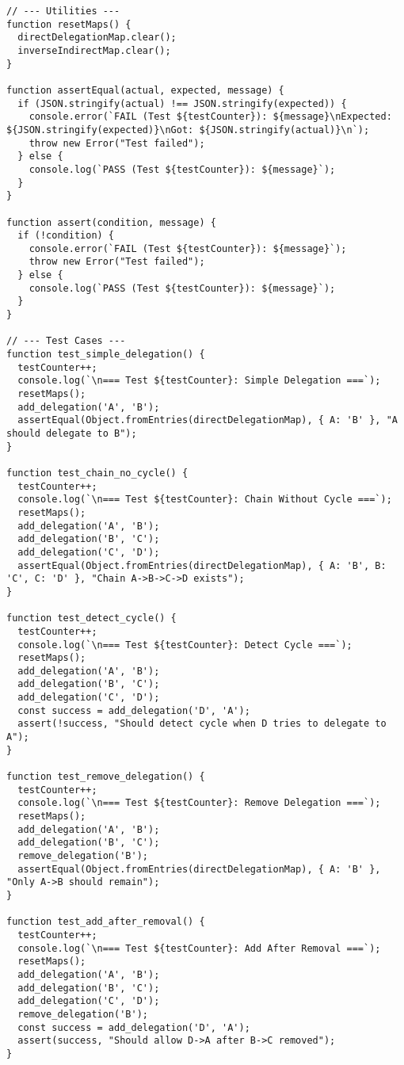 \begin{verbatim}
// --- Utilities ---
function resetMaps() {
  directDelegationMap.clear();
  inverseIndirectMap.clear();
}

function assertEqual(actual, expected, message) {
  if (JSON.stringify(actual) !== JSON.stringify(expected)) {
    console.error(`FAIL (Test ${testCounter}): ${message}\nExpected: ${JSON.stringify(expected)}\nGot: ${JSON.stringify(actual)}\n`);
    throw new Error("Test failed");
  } else {
    console.log(`PASS (Test ${testCounter}): ${message}`);
  }
}

function assert(condition, message) {
  if (!condition) {
    console.error(`FAIL (Test ${testCounter}): ${message}`);
    throw new Error("Test failed");
  } else {
    console.log(`PASS (Test ${testCounter}): ${message}`);
  }
}

// --- Test Cases ---
function test_simple_delegation() {
  testCounter++;
  console.log(`\n=== Test ${testCounter}: Simple Delegation ===`);
  resetMaps();
  add_delegation('A', 'B');
  assertEqual(Object.fromEntries(directDelegationMap), { A: 'B' }, "A should delegate to B");
}

function test_chain_no_cycle() {
  testCounter++;
  console.log(`\n=== Test ${testCounter}: Chain Without Cycle ===`);
  resetMaps();
  add_delegation('A', 'B');
  add_delegation('B', 'C');
  add_delegation('C', 'D');
  assertEqual(Object.fromEntries(directDelegationMap), { A: 'B', B: 'C', C: 'D' }, "Chain A->B->C->D exists");
}

function test_detect_cycle() {
  testCounter++;
  console.log(`\n=== Test ${testCounter}: Detect Cycle ===`);
  resetMaps();
  add_delegation('A', 'B');
  add_delegation('B', 'C');
  add_delegation('C', 'D');
  const success = add_delegation('D', 'A');
  assert(!success, "Should detect cycle when D tries to delegate to A");
}

function test_remove_delegation() {
  testCounter++;
  console.log(`\n=== Test ${testCounter}: Remove Delegation ===`);
  resetMaps();
  add_delegation('A', 'B');
  add_delegation('B', 'C');
  remove_delegation('B');
  assertEqual(Object.fromEntries(directDelegationMap), { A: 'B' }, "Only A->B should remain");
}

function test_add_after_removal() {
  testCounter++;
  console.log(`\n=== Test ${testCounter}: Add After Removal ===`);
  resetMaps();
  add_delegation('A', 'B');
  add_delegation('B', 'C');
  add_delegation('C', 'D');
  remove_delegation('B');
  const success = add_delegation('D', 'A');
  assert(success, "Should allow D->A after B->C removed");
}


\end{verbatim}
